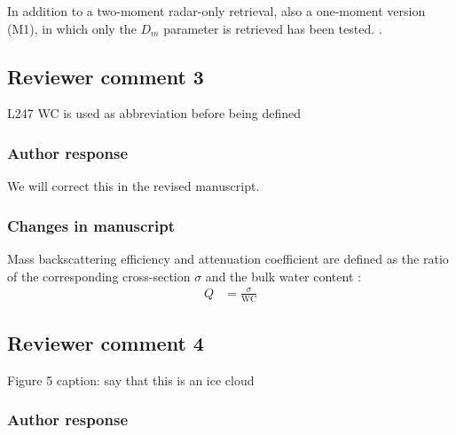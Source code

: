   \begin{change}[220]
 In addition to a two-moment radar-only retrieval, also a one-moment version
 (M1), in which only the $D_m$ parameter is retrieved has been tested.
 \DIFdelbegin {}\DIFdelend \DIFaddbegin {}\DIFaddend .
  \end{change}

\subsection*{Reviewer comment 3}

 L247 WC is used as abbreviation before being defined

\subsubsection{Author response}

We will correct this in the revised manuscript.

\subsubsection*{Changes in manuscript}

  \begin{change}[247]
 Mass backscattering efficiency and attenuation coefficient are defined as the
 ratio of the corresponding cross-section $\sigma$ and the bulk water content
 \DIFaddbegin {}\DIFaddend :
\begin{align}
  Q &= \frac{\sigma}{\text{WC}}
\end{align}
\end{change}

\subsection*{Reviewer comment 4}

 Figure 5 caption: say that this is an ice cloud

\subsubsection{Author response}

